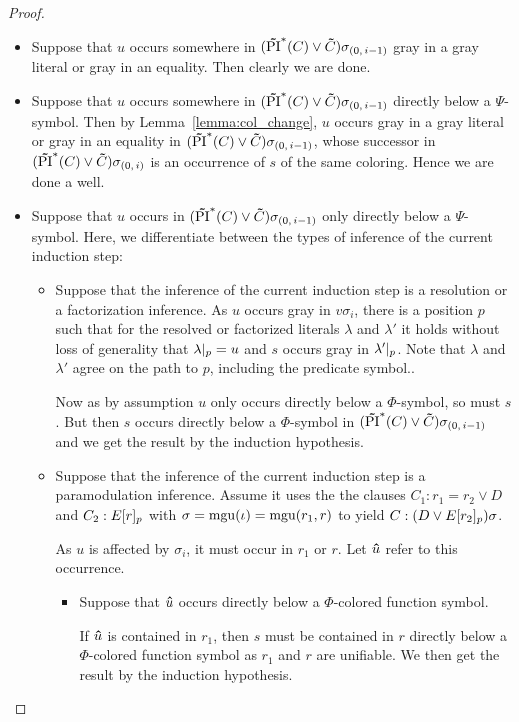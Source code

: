 \documentclass[%
	draft=false,%
	numbers=noendperiod,%
	11pt,%
	a4paper,%
	oneside,%
	openany,%
]{memoir}
\begin{document}
\begin{proof}
\begin{itemize}
			\begin{itemize}
				\item Suppose that $u$ occurs somewhere in $(\bm\tilde{\operatorname{PI}}^{*}(C)\lor \bm\tilde{C})\sigma_{(0,\,i-1)}$ gray in a gray literal or gray in an equality. Then clearly we are done.
				\item Suppose that $u$ occurs somewhere in $(\bm\tilde{\operatorname{PI}}^{*}(C)\lor \bm\tilde{C})\sigma_{(0,\,i-1)}$ directly below a $\Psi$-symbol.
					Then by Lemma~\ref{lemma:col_change}, $u$ occurs gray in a gray literal or gray in an equality in $(\bm\tilde{\operatorname{PI}}^{*}(C)\lor \bm\tilde{C})\sigma_{(0,\,i-1)}$, whose successor in $(\bm\tilde{\operatorname{PI}}^{*}(C)\lor \bm\tilde{C})\sigma_{(0,\,i)}$ is an occurrence of $s$ of the same coloring. Hence we are done a well.
				\item Suppose that $u$ occurs in $(\bm\tilde{\operatorname{PI}}^{*}(C)\lor \bm\tilde{C})\sigma_{(0,\,i-1)}$ only directly below a $\Psi$-symbol.
					Here, we differentiate between the types of inference of the current induction step:

					\begin{itemize}
						\item
							Suppose that the inference of the current induction step is a resolution or a factorization inference.
							As $u$ occurs gray in $v\sigma_i$, there is a position $p$ such that for the resolved or factorized literals $\lambda$ and $\lambda'$ it holds without loss of generality that $\lambda|_{p} = u$ and $s$ occurs gray in $\lambda'|_{p}$.
							Note that $\lambda$ and $\lambda'$ agree on the path to $p$, including the predicate symbol..

							Now as by assumption $u$ only occurs directly below a $\Phi$-symbol, so must $s$.
							But then $s$ occurs directly below a $\Phi$-symbol in $(\bm\tilde{\operatorname{PI}}^{*}(C)\lor \bm\tilde{C})\sigma_{(0,\,i-1)}$ and we get the result by the induction hypothesis.

						\item
							Suppose that the inference of the current induction step is a paramodulation inference.
							Assume it uses the the clauses $C_1: r_1=r_2 \lor D$ and $C_2: E{[r]_{p}}$ with $\sigma=\operatorname{mgu}(\iota)=\operatorname{mgu}(r_1, r)$ to yield $C: (D\lor E{[r_2]_{p}})\sigma$.

							As $u$ is affected by $\sigma_i$, it must occur in $r_1$ or $r$. Let $\bm\hat u$ refer to this occurrence.

							\begin{itemize}
								\item
									Suppose that $\bm\hat u$ occurs directly below a $\Phi$-colored function symbol. 

									If $\bm\hat u$ is contained in $r_1$, then $s$ must be contained in $r$ directly below a $\Phi$-colored function symbol as $r_1$ and $r$ are unifiable. We then get the result by the induction hypothesis.


\end{itemize}
\end{itemize}
\end{itemize}
\end{itemize}
\end{proof}
\end{document}
